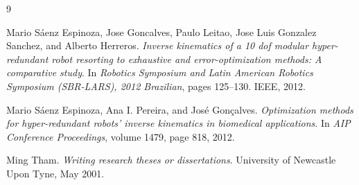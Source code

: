 
\begin{thebibliography}{9}

Mario Sáenz Espinoza, Jose Goncalves, Paulo Leitao, Jose Luis Gonzalez Sanchez, and Alberto Herreros.
\textit{Inverse kinematics of a 10 dof modular hyper-redundant robot resorting to exhaustive and error-optimization methods: A comparative study}.
In \textit{Robotics Symposium and Latin American Robotics Symposium (SBR-LARS), 2012 Brazilian}, pages 125--130. IEEE, 2012.

Mario Sáenz Espinoza, Ana I. Pereira, and José Gonçalves.
\textit{Optimization methods for hyper-redundant robots’ inverse kinematics in biomedical applications}.
In \textit{AIP Conference Proceedings}, volume 1479, page 818, 2012.

Ming Tham.
\textit{Writing research theses or dissertations}.
University of Newcastle Upon Tyne, May 2001.

\end{thebibliography}